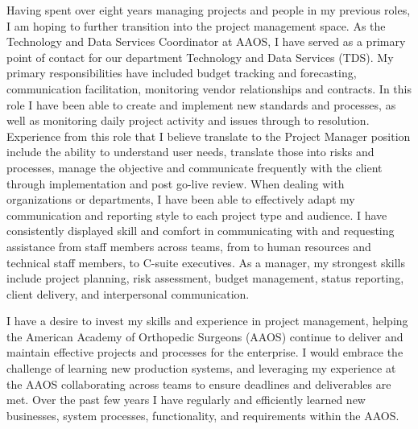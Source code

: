 \documentclass[9pt, a4paper]{awesome-cv}
\begin{document}
\makecvheader

\makelettertitle

\begin{cvletter}
Having spent over eight years managing projects and people in my previous roles, I am hoping to further transition into the project management space. As the Technology and Data Services Coordinator at AAOS, I have served as a primary point of contact for our department Technology and Data Services (TDS). My primary responsibilities have included budget tracking and forecasting, communication facilitation, monitoring vendor relationships and contracts. In this role I have been able to create and implement new standards and processes, as well as monitoring daily project activity and issues through to resolution. Experience from this role that I believe translate to the Project Manager position include the ability to understand user needs, translate those into risks and processes, manage the objective and communicate frequently with the client through implementation and post go-live review. When dealing with organizations or departments, I have been able to effectively adapt my communication and reporting style to each project type and audience. I have consistently displayed skill and comfort in communicating with and requesting assistance from staff members across teams, from to human resources and technical staff members, to C-suite executives. As a manager, my strongest skills include project planning, risk assessment, budget management, status reporting, client delivery, and interpersonal communication.

I have a desire to invest my skills and experience in project management, helping the American Academy of Orthopedic Surgeons (AAOS) continue to deliver and maintain effective projects and processes for the enterprise. I would embrace the challenge of learning new production systems, and leveraging my experience at the AAOS collaborating across teams to ensure deadlines and deliverables are met. Over the past few years I have regularly and efficiently learned new businesses, system processes, functionality, and requirements within the AAOS.\\


\end{cvletter}
\end{document}
